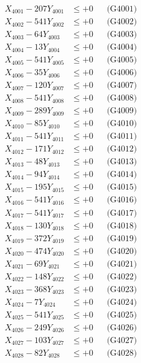 \documentclass[a4paper,10pt]{article}
\begin{document}
{\begin{align}
\allowbreak
X_{4001} - 207Y_{4001} &\leq +0 && \text{(G4001)} \\
X_{4002} - 541Y_{4002} &\leq +0 && \text{(G4002)} \\
X_{4003} - 64Y_{4003} &\leq +0 && \text{(G4003)} \\
X_{4004} - 13Y_{4004} &\leq +0 && \text{(G4004)} \\
X_{4005} - 541Y_{4005} &\leq +0 && \text{(G4005)} \\
X_{4006} - 35Y_{4006} &\leq +0 && \text{(G4006)} \\
X_{4007} - 120Y_{4007} &\leq +0 && \text{(G4007)} \\
X_{4008} - 541Y_{4008} &\leq +0 && \text{(G4008)} \\
X_{4009} - 289Y_{4009} &\leq +0 && \text{(G4009)} \\
X_{4010} - 85Y_{4010} &\leq +0 && \text{(G4010)} \\
\allowbreak
X_{4011} - 541Y_{4011} &\leq +0 && \text{(G4011)} \\
X_{4012} - 171Y_{4012} &\leq +0 && \text{(G4012)} \\
X_{4013} - 48Y_{4013} &\leq +0 && \text{(G4013)} \\
X_{4014} - 94Y_{4014} &\leq +0 && \text{(G4014)} \\
X_{4015} - 195Y_{4015} &\leq +0 && \text{(G4015)} \\
X_{4016} - 541Y_{4016} &\leq +0 && \text{(G4016)} \\
X_{4017} - 541Y_{4017} &\leq +0 && \text{(G4017)} \\
X_{4018} - 130Y_{4018} &\leq +0 && \text{(G4018)} \\
X_{4019} - 372Y_{4019} &\leq +0 && \text{(G4019)} \\
X_{4020} - 474Y_{4020} &\leq +0 && \text{(G4020)} \\
\allowbreak
X_{4021} - 69Y_{4021} &\leq +0 && \text{(G4021)} \\
X_{4022} - 148Y_{4022} &\leq +0 && \text{(G4022)} \\
X_{4023} - 368Y_{4023} &\leq +0 && \text{(G4023)} \\
X_{4024} - 7Y_{4024} &\leq +0 && \text{(G4024)} \\
X_{4025} - 541Y_{4025} &\leq +0 && \text{(G4025)} \\
X_{4026} - 249Y_{4026} &\leq +0 && \text{(G4026)} \\
X_{4027} - 103Y_{4027} &\leq +0 && \text{(G4027)} \\
X_{4028} - 82Y_{4028} &\leq +0 && \text{(G4028)} \\

\end{align}}
\end{document}
